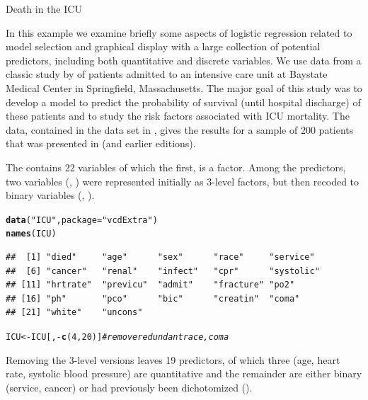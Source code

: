 \documentclass[11pt]{book}\usepackage[]{graphicx}\usepackage[]{color}
\makeatletter
\newcommand{\hlnum}[1]{\textcolor[rgb]{0.686,0.059,0.569}{#1}}%
\newcommand{\hlstr}[1]{\textcolor[rgb]{0.192,0.494,0.8}{#1}}%
\newcommand{\hlcom}[1]{\textcolor[rgb]{0.678,0.584,0.686}{\textit{#1}}}%
\newcommand{\hlopt}[1]{\textcolor[rgb]{0,0,0}{#1}}%
\newcommand{\hlstd}[1]{\textcolor[rgb]{0.345,0.345,0.345}{#1}}%
\newcommand{\hlkwb}[1]{\textcolor[rgb]{0.69,0.353,0.396}{#1}}%
\newcommand{\hlkwc}[1]{\textcolor[rgb]{0.333,0.667,0.333}{#1}}%
\newcommand{\hlkwd}[1]{\textcolor[rgb]{0.737,0.353,0.396}{\textbf{#1}}}%
\newenvironment{kframe}{%
 \def\at@end@of@kframe{}%
 \ifinner\ifhmode%
  \def\at@end@of@kframe{\end{minipage}}%
  \begin{minipage}{\columnwidth}%
 \fi\fi%
 \def\FrameCommand##1{\hskip\@totalleftmargin \hskip-\fboxsep
 \colorbox{shadecolor}{##1}\hskip-\fboxsep
     \hskip-\linewidth \hskip-\@totalleftmargin \hskip\columnwidth}%
 \MakeFramed {\advance\hsize-\width
   \@totalleftmargin\z@ \linewidth\hsize
   \@setminipage}}%
 {\par\unskip\endMakeFramed%
 \at@end@of@kframe}
\newenvironment{knitrout}{}{} %
\renewenvironment{knitrout}{\small\renewcommand{\baselinestretch}{.85}}{} %
\makeatother
\begin{document}
\begin{Example}[icu1]{Death in the ICU}

In this example we examine briefly some aspects of logistic regression
related to model selection and graphical display with a large collection
of potential predictors, including both 
quantitative and discrete variables.
We use data from a classic study by
\citet{Lemeshow-etal:88} of patients admitted to an intensive care unit at
Baystate Medical Center in Springfield,
Massachusetts.  The major goal of this study was to develop a 
model to predict the probability of survival (until hospital
discharge) of these patients and to study the risk factors associated with 
ICU mortality.
The data, contained in the data set  in ,
gives the results for a sample of 200 patients 
that was presented in \citet{HosmerLemeshowSturdivant:2013}
(and earlier editions).

The  contains 22 variables of which the first, 
is a factor.  Among the predictors, two variables (, )
were represented initially as 3-level factors, but then recoded to
binary variables (, ).  
\begin{knitrout}
\color{fgcolor}\begin{kframe}
\begin{alltt}
\hlkwd{data}\hlstd{(}\hlstr{"ICU"}\hlstd{,} \hlkwc{package}\hlstd{=}\hlstr{"vcdExtra"}\hlstd{)}
\hlkwd{names}\hlstd{(ICU)}
\end{alltt}
\begin{verbatim}
##  [1] "died"     "age"      "sex"      "race"     "service" 
##  [6] "cancer"   "renal"    "infect"   "cpr"      "systolic"
## [11] "hrtrate"  "previcu"  "admit"    "fracture" "po2"     
## [16] "ph"       "pco"      "bic"      "creatin"  "coma"    
## [21] "white"    "uncons"
\end{verbatim}
\begin{alltt}
\hlstd{ICU} \hlkwb{<-} \hlstd{ICU[,}\hlopt{-}\hlkwd{c}\hlstd{(}\hlnum{4}\hlstd{,} \hlnum{20}\hlstd{)]}  \hlcom{# remove redundant race, coma}
\end{alltt}
\end{kframe}
\end{knitrout}
Removing the 3-level versions leaves 19 predictors, of which three
(age, heart rate, systolic blood pressure) are quantitative
and the remainder are either binary  (service, cancer) or had
previously been dichotomized ().


\end{Example}
\end{document}
